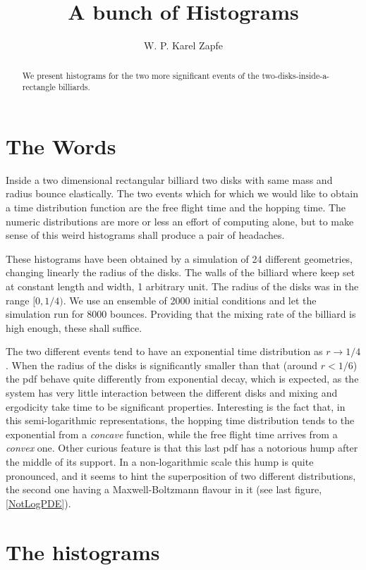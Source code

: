 \documentclass[a4paper,10pt]{article}
\title{A bunch of Histograms}
\author{W. P. Karel Zapfe}
\begin{document}
\maketitle
\begin{abstract}
 We present histograms for the two more significant events of
the two-disks-inside-a-rectangle billiards.
\end{abstract}

\section{The Words}

Inside a two dimensional rectangular billiard two disks with same mass
and radius bounce elastically. The two events which for which we would 
like to obtain a time distribution function are the free flight time and
the hopping time. The numeric distributions are more or less an
effort of computing alone, but to make sense of this weird histograms
shall produce a pair of headaches.

These histograms have been obtained by a simulation of 24 different geometries,
changing linearly the radius of the disks. The walls of the billiard
where keep set at constant length and width, 1 arbitrary unit. 
The radius of the disks was in the range $[0, 1/4)$.
We use an ensemble of 2000 initial conditions and let the simulation
run for 8000 bounces. Providing that the mixing rate of the
billiard is high enough, these shall suffice. 

The two different events tend to have an exponential time distribution
as $r\rightarrow 1/4$. When the radius of the disks is significantly smaller
than that (around $ r < 1/6$) the pdf behave quite differently from exponential 
decay, which is expected, as the system has very little interaction
between the different disks and mixing and ergodicity take time to be
significant properties. Interesting is the fact that, in this
semi-logarithmic representations,  the hopping time distribution
tends to the exponential from a \emph{concave} function, while 
the free flight time arrives from a \emph{convex} one.
Other curious feature is that this last pdf has a 
notorious hump after the middle of its support. In a non-logarithmic scale this
hump is quite pronounced, and it seems to hint the superposition of 
two different distributions, the second one having a Maxwell-Boltzmann flavour
in it (see last figure, \ref{NotLogPDE}).

\section{The histograms}
\end{document}
